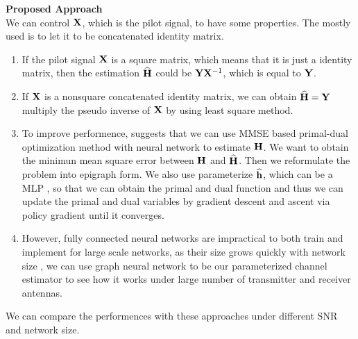 \documentclass[a4paper, onecolumn, , 11pt]{IEEEtran}
\begin{document}
    \noindent \textbf{Proposed Approach}\\
        We can control ${\bf X}$, which is the pilot signal, to have some properties. The mostly used is to let it to be concatenated identity matrix.
        \begin{enumerate}
            \item If the pilot signal ${\bf X}$ is a square matrix, which means that it is just a identity matrix, then the estimation $\widehat{{\bf H}}$ could be 
                ${\bf Y}{\bf X}^{-1}$, which is equal to ${\bf Y}$.
            \item If ${\bf X}$ is a nonsquare concatenated identity matrix, we can obtain $\widehat{{\bf H}}= {\bf Y}$ multiply the pseudo inverse of ${\bf X}$ by using least square method.
            \item To improve performence, \cite{Carrson} suggests that we can use MMSE based primal-dual optimization method with neural network to estimate ${{\bf H}}$.
                We want to obtain the minimun mean square error between ${\bf H}$ and $\widehat{{\bf H}}$. Then we reformulate the problem into epigraph form. We also use 
                parameterize $\widehat{{\bf h}}$, which can be a MLP \cite{Eisen2019journal}, so that we can obtain the primal and dual function and thus we can 
                update the primal and dual variables by gradient descent and ascent via policy gradient \cite{Eisen2019journal} until it converges.
            \item However, fully connected neural networks are impractical to both train and implement for large scale networks, as their size grows quickly with 
                network size \cite{Eisen2019conf}, we can use graph neural network \cite{Eisen2020,Naderi2022,Naderi2023} to be our parameterized 
                channel estimator to see how it works under large number of transmitter and receiver antennas.
        \end{enumerate}
        We can compare the performences with these approaches under different SNR and network size.

\end{document}
